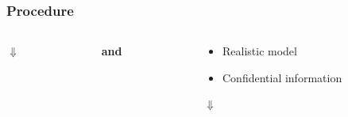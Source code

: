 \begin{frame}
    \frametitle{Procedure}
    \begin{columns}[onlytextwidth]
        \begin{column}{0.4\textwidth}
            \begin{block}{}
         
        
            \end{block}
            
            \centering
            $\Downarrow$

            
            \begin{block}{}
            \end{block}
        \end{column}
        
        
        \begin{column}{0.065\textwidth}
        \textbf{and}
        \end{column}
        
        \begin{column}{0.4\textwidth}
            \begin{exampleblock}{}
                \begin{itemize}
                    \item{Realistic model}
                    \item{Confidential information}
                \end{itemize}
            \end{exampleblock}
            
            \centering
            $\Downarrow$
            
            
            
            
            
            \begin{exampleblock}{}
            \end{exampleblock}
        \end{column}
    \end{columns}
\end{frame}        
        

